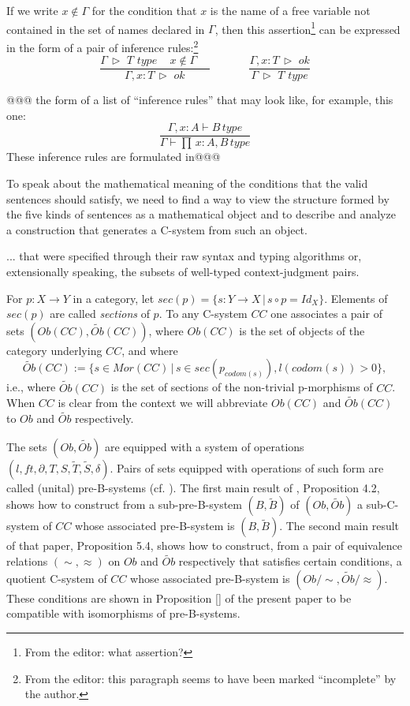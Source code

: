 \documentclass[12pt]{amsart}
\newenvironment{eq}{\begin{equation}}{\end{equation}}
\newcommand{\llabel}[1]{\label{#1}}
\newcommand{\sr}{\rightarrow}
\newcommand{\wt}{\widetilde}
\newcommand{\spc}{{\,\,\,\,\,\,\,}}
\newcommand{\rh}{{\,\rhd\,\,}}
\newcommand{\type}{\,\,type}
\begin{document}
If we write $x\notin \Gamma$ for the condition that $x$ is the name of a free
variable not contained in the set of names declared in $\Gamma$, then this
assertion\footnote{From the editor: what assertion?} can be expressed in the form of a pair of inference rules:\footnote{From the editor: this paragraph seems to have been marked ``incomplete'' by the author.}
%
$$
\frac{\Gamma\rh T\type \spc x\notin\Gamma\spc}{\Gamma, x:T\rh ok}
\spc\spc\spc
\frac{\Gamma, x:T\rh ok}{\Gamma\rh T\type}
$$
%


@@@
the form of a list of ``inference rules'' that may look like, for example, this one:
%
\begin{eq}
\llabel{2017.03.02.eq1}
\frac{\Gamma,x:A\vdash B\,type}{\Gamma\vdash \prod\,x:A,B\,type}
\end{eq}%
%
These inference rules are formulated in@@@


To speak about the mathematical meaning of the conditions that the valid sentences should satisfy, we need to find a way to view the structure formed by the five kinds of sentences as a mathematical object and to describe and analyze a construction that generates a C-system from such an object.

...  that were specified through their raw syntax and typing algorithms or,
extensionally speaking, the subsets of well-typed context-judgment pairs.


For $p:X\sr Y$ in a category, let $sec(p)=\{s:Y\sr X\,|\,s\circ
p=Id_X\}$. Elements of $sec(p)$ are called {\em sections} of $p$. To any C-system
$CC$ one associates a pair of sets $(Ob(CC),\wt{Ob}(CC))$, where $Ob(CC)$ is the
set of objects of the category underlying $CC$, and where
%
\begin{eq}
\llabel{2017.02.04.eq1}
\wt{Ob}(CC):=\{s\in Mor(CC)\,|\,s\in sec(p_{codom(s)}), l(codom(s))>0\},
\end{eq}%
%
i.e., where $\wt{Ob}(CC)$ is the set of sections of the non-trivial
p-morphisms of $CC$. When $CC$ is clear from the context we will abbreviate
$Ob(CC)$ and $\wt{Ob}(CC)$ to $Ob$ and $\wt{Ob}$ respectively.

The sets $(Ob,\wt{Ob})$ are equipped with a system of operations
$(l,ft,\partial,T,S,\wt{T},\wt{S},\delta)$. Pairs of sets equipped with
operations of such form are called (unital) pre-B-systems
(cf.{} \cite{Bsystemsnew}). The first main result of \cite{Csubsystems},
Proposition 4.2, shows how to construct from a sub-pre-B-system $(B,\wt{B})$ of
$(Ob,\wt{Ob})$ a sub-C-system of $CC$ whose associated pre-B-system is
$(B,\wt{B})$. The second main result of that paper, Proposition 5.4, shows how
to construct, from a pair of equivalence relations $(\sim,\approx)$ on $Ob$ and
$\wt{Ob}$ respectively that satisfies certain conditions, a quotient C-system
of $CC$ whose associated pre-B-system is $(Ob/{\sim},\wt{Ob}/\approx)$. These
conditions are shown in Proposition \ref{} of the present paper to be
compatible with isomorphisms of pre-B-systems.
\end{document}
